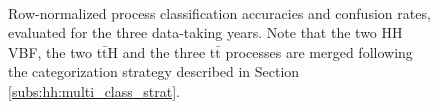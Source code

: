 \documentclass[../main.tex]{subfiles}
\begin{document}
\begin{figure}[h!]
\begin{center}
 \\
\end{center}
\caption[Multi-class confusion matrices]{Row-normalized process classification accuracies and confusion rates, evaluated for the three data-taking years. Note that the two HH VBF, the two t$\bar{\text{t}}$H and the three t$\bar{\text{t}}$ processes are merged following the categorization strategy described in Section \ref{subs:hh:multi_class_strat}.}
\label{hh:fig:multi_confusion}
\end{figure}


%
%
\end{document}
